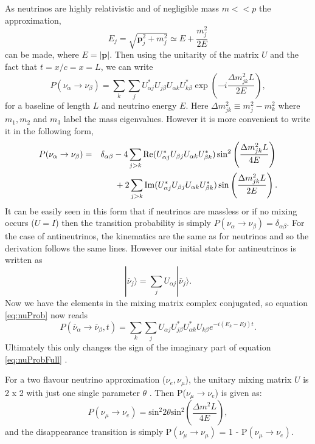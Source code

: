 As neutrinos are highly relativistic and of negligible mass $m << p$ the approximation,
\begin{equation}
E_{j} = \sqrt{\textbf{p}_{j}^{2} + m_{j}^{2}} \simeq E + \frac {m^{2}_{j}}{2E} 
\end{equation}
can be made, where $E = |\textbf{p}|$. Then using the unitarity of the matrix $U$ and the fact that $ t = x/c = x = L $, we can write
\begin{equation}
P(\nu_{\alpha} \to \nu_{\beta})  = \sum_{k}\sum_{j}U_{\alpha j}^{\ast}U_{j \beta}U_{\alpha k}U_{k \beta}^{\ast}\exp\left(-i\frac{\Delta m^{2}_{jk} L}{2E}\right),
\end{equation}
for a baseline of length $L$ and neutrino energy $E$. Here
$\Delta m^{2}_{jk} \equiv m^{2}_{j} - m^{2}_{k}$ where $m_{1},m_{2}$ and $m_{3}$
label the mass eigenvalues. However it is more convenient to write it in the following form,
\begin{eqnarray}
P(\nu_{\alpha} \to \nu_{\beta}) & = & \delta_{\alpha\beta} - 4\sum_{j>k}\textrm{Re}(U_{\alpha j}^{\ast}U_{\beta j}U_{\alpha k}U_{\beta k}^{\ast})\sin^{2}\left(\frac{\Delta m^{2}_{jk} L}{4E} \right) \notag{}\\
&& {} + 2\sum_{j>k}\textrm{Im}(U_{\alpha j}^{\ast}U_{\beta j}U_{\alpha k}U_{\beta k}^{\ast})\sin \left(\frac{\Delta m^{2}_{jk} L}{2E} \right).
\label{eq:nuProbFull}
\end{eqnarray}
It can be easily seen in this form that if neutrinos are massless or if no mixing occurs ($U = I$) then the transition probability is simply $P(\nu_{\alpha} \to \nu_{\beta}) =  \delta_{\alpha\beta}$. For the case of antineutrinos, the kinematics are the same as for neutrinos and so the derivation follows the same lines. However our initial state for antineutrinos is written as
\begin{equation}
	|\overline{\nu}_{j}\rangle = \sum_{j}U_{\alpha j}|\overline{\nu}_{j}\rangle. 
\end{equation}
Now we have the elements in the mixing matrix complex conjugated, so equation \ref{eq:nuProb} now reads
\begin{equation}
P(\overline{\nu}_{\alpha} \to \overline{\nu}_{\beta},t) = \sum_{k}\sum_{j}U_{\alpha j}U_{j \beta}^{\ast}U_{\alpha k}^{\ast}U_{k \beta}e^{-i(E_{k} - E{j}) t}.
\label{eq:antinuProb}
\end{equation}
Ultimately this only changes the sign of the imaginary part of equation \ref{eq:nuProbFull} \cite{giuntiNeutrino}.

For a two flavour neutrino approximation ($\nu_{e}, \nu_{\mu}$), the unitary mixing matrix $U$ is 2 x 2 with just one single parameter $\theta$ \cite{georgeThesis}. Then P($\nu_{\mu} \to \nu_{e}$) is given as:
\begin{equation}
P(\nu_{\mu} \to \nu_{e}) = \textrm{sin}^{2}2\theta\textrm{sin}^{2}\left(\frac{\Delta m^{2}L}{4E}\right),
\end{equation}
and the disappearance transition is simply P$(\nu_{\mu} \to \nu_{\mu})$ = 1 - P$(\nu_{\mu} \to \nu_{e})$.

